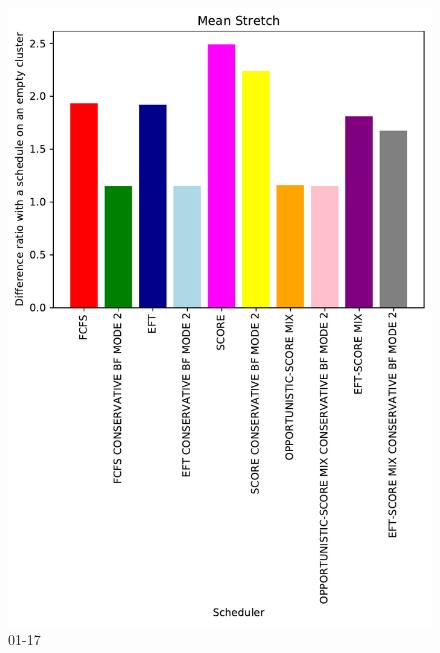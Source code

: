 \documentclass[a4paper]{article}
\begin{document}
\begin{figure}\includegraphics[width=0.9\linewidth]{MBSS/plot/Results_FCFS_Score_Backfill_2022-01-17->2022-01-17_V10000_Mean_Stretch_450_128_32_256_4_1024.pdf}\caption{01-17}\end{figure}
\end{document}
